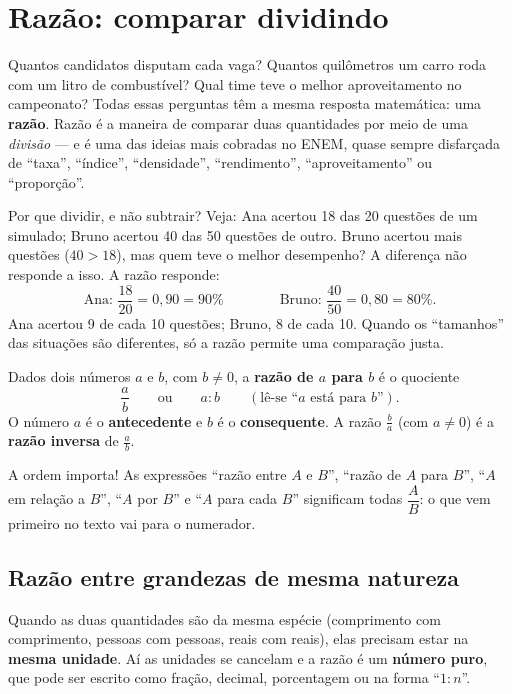 
\section{Razão: comparar dividindo}

Quantos candidatos disputam cada vaga? Quantos quilômetros um carro roda com
um litro de combustível? Qual time teve o melhor aproveitamento no campeonato?
Todas essas perguntas têm a mesma resposta matemática: uma \textbf{razão}.
Razão é a maneira de comparar duas quantidades por meio de uma
\emph{divisão} — e é uma das ideias mais cobradas no ENEM, quase sempre
disfarçada de ``taxa'', ``índice'', ``densidade'', ``rendimento'',
``aproveitamento'' ou ``proporção''.

Por que dividir, e não subtrair? Veja: Ana acertou 18 das 20 questões de um
simulado; Bruno acertou 40 das 50 questões de outro. Bruno acertou mais
questões ($40 > 18$), mas quem teve o melhor desempenho? A diferença não
responde a isso. A razão responde:
\[
  \text{Ana: } \frac{18}{20} = 0{,}90 = 90\%
  \qquad\qquad
  \text{Bruno: } \frac{40}{50} = 0{,}80 = 80\%.
\]
Ana acertou 9 de cada 10 questões; Bruno, 8 de cada 10. Quando os
``tamanhos'' das situações são diferentes, só a razão permite uma comparação
justa.

\begin{definicao}[Razão]
Dados dois números $a$ e $b$, com $b \neq 0$, a \textbf{razão de $a$ para $b$}
é o quociente
\[
  \frac{a}{b} \qquad\text{ou}\qquad a : b \qquad (\text{lê-se ``$a$ está para $b$''}).
\]
O número $a$ é o \textbf{antecedente} e $b$ é o \textbf{consequente}. A razão
$\frac{b}{a}$ (com $a \neq 0$) é a \textbf{razão inversa} de $\frac{a}{b}$.
\end{definicao}

A ordem importa! As expressões ``razão entre $A$ e $B$'', ``razão de $A$ para
$B$'', ``$A$ em relação a $B$'', ``$A$ por $B$'' e ``$A$ para cada $B$''
significam todas $\dfrac{A}{B}$: o que vem primeiro no texto vai para o
numerador.

\subsection{Razão entre grandezas de mesma natureza}

Quando as duas quantidades são da mesma espécie (comprimento com comprimento,
pessoas com pessoas, reais com reais), elas precisam estar na
\textbf{mesma unidade}. Aí as unidades se cancelam e a razão é um
\textbf{número puro}, que pode ser escrito como fração, decimal, porcentagem
ou na forma ``$1 : n$''.

